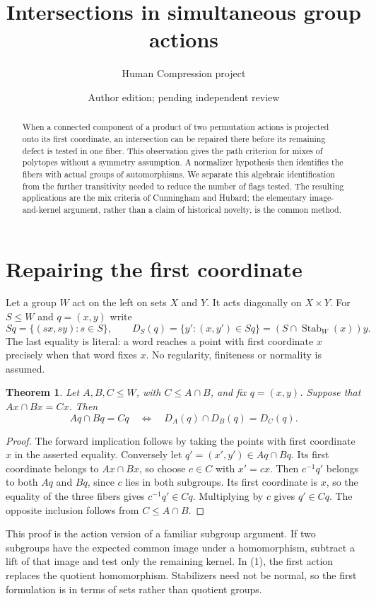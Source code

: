 \documentclass[a4paper,11pt]{article}
\title{Intersections in simultaneous group actions}
\author{Human Compression project}\date{Author edition; pending independent review}
\newcommand{\Stab}{\operatorname{Stab}}
\newtheorem{theorem}{Theorem}\newtheorem{lemma}[theorem]{Lemma}\newtheorem{corollary}[theorem]{Corollary}\newtheorem{proposition}[theorem]{Proposition}
\begin{document}
\maketitle
\begin{abstract}
When a connected component of a product of two permutation actions is
projected onto its first coordinate, an intersection can be repaired
there before its remaining defect is tested in one fiber. This observation
gives the path criterion for mixes of polytopes without a symmetry
assumption. A normalizer hypothesis then identifies the fibers with
actual groups of automorphisms. We separate this algebraic identification
from the further transitivity needed to reduce the number of flags tested.
The resulting applications are the mix criteria of Cunningham and Hubard;
the elementary image-and-kernel argument, rather than a claim of
historical novelty, is the common method.
\end{abstract}

\section{Repairing the first coordinate}
Let a group $W$ act on the left on sets $X$ and $Y$. It acts diagonally on
$X\times Y$. For $S\leq W$ and $q=(x,y)$ write
\[
 S q=\{(s x,s y):s\in S\},\qquad
 D_S(q)=\{y':(x,y')\in S q\}=(S\cap\Stab_W(x))y.
\]
The last equality is literal: a word reaches a point with first coordinate
$x$ precisely when that word fixes $x$. No regularity, finiteness or
normality is assumed.

\begin{theorem}\label{fiber}
Let $A,B,C\leq W$, with $C\leq A\cap B$, and fix $q=(x,y)$.
Suppose that $Ax\cap Bx=Cx$. Then
\[
 Aq\cap Bq=Cq\quad\Longleftrightarrow\quad
 D_A(q)\cap D_B(q)=D_C(q).                         \tag{1}
\]
\end{theorem}
\begin{proof}
The forward implication follows by taking the points with first coordinate
$x$ in the asserted equality. Conversely let $q'=(x',y')\in Aq\cap Bq$.
Its first coordinate belongs to $Ax\cap Bx$, so choose $c\in C$ with
$x'=cx$. Then $c^{-1}q'$ belongs to both $Aq$ and $Bq$, since $c$ lies
in both subgroups. Its first coordinate is $x$, so the equality of the
three fibers gives $c^{-1}q'\in Cq$. Multiplying by $c$ gives $q'\in Cq$.
The opposite inclusion follows from $C\leq A\cap B$.
\end{proof}

This proof is the action version of a familiar subgroup argument. If two
subgroups have the expected common image under a homomorphism, subtract
a lift of that image and test only the remaining kernel. In (1), the
first action replaces the quotient homomorphism. Stabilizers need not be
normal, so the first formulation is in terms of sets rather than quotient
groups.
\end{document}
